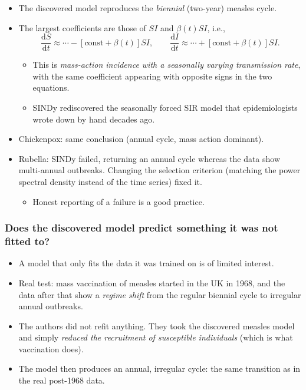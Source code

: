\documentclass[20pt]{extarticle}
\begin{document}
\begin{itemize}
\item The discovered model reproduces the \emph{biennial} (two-year) measles cycle.
\item The largest coefficients are those of $SI$ and $\beta(t) SI$, i.e.,
\[ \frac{\text{d}S}{\text{d}t} \approx \cdots - \left[\text{const} + \beta(t)\right] SI, \qquad
\frac{\text{d}I}{\text{d}t} \approx \cdots + \left[\text{const} + \beta(t)\right] SI . \]
	\begin{itemize}
	\item This is \emph{mass-action incidence with a seasonally varying transmission rate}, with the same coefficient appearing with opposite signs in the two equations.
	\item SINDy rediscovered the seasonally forced SIR model that epidemiologists wrote down by hand decades ago.
	\end{itemize}
\item Chickenpox: same conclusion (annual cycle, mass action dominant).
\item Rubella: SINDy failed, returning an annual cycle whereas the data show multi-annual outbreaks. Changing the selection criterion (matching the power spectral density instead of the time series) fixed it.
	\begin{itemize}
	\item Honest reporting of a failure is a good practice.
	\end{itemize}
\end{itemize}

\subsubsection*{Does the discovered model predict something it was not fitted to?}

\begin{itemize}
\item A model that only fits the data it was trained on is of limited interest.
\item Real test: mass vaccination of measles started in the UK in 1968, and the data after that show a \emph{regime shift} from the regular biennial cycle to irregular annual outbreaks.
\item The authors did not refit anything. They took the discovered measles model and simply \emph{reduced the recruitment of susceptible individuals} (which is what vaccination does).
\item The model then produces an annual, irregular cycle: the same transition as in the real post-1968 data.
\end{itemize}
\end{document}
